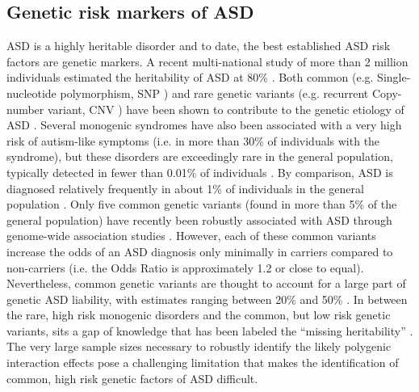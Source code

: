 \documentclass[9pt,lineno]{elife}
\begin{document}
\subsection{Genetic risk markers of ASD}
ASD is a highly heritable disorder and to date, the best established ASD risk factors are genetic markers. A recent multi-national study of more than 2 million individuals estimated the heritability of ASD at 80\% \citep{Bai2019-hb}. Both common (e.g. Single-nucleotide polymorphism, SNP \citep{Grove2019-vz}) and rare genetic variants (e.g. recurrent Copy-number variant, CNV \citep{Sanders2019-wi}) have been shown to contribute to the genetic etiology of ASD \citep{Geschwind2015-ss}. Several monogenic syndromes have also been associated with a very high risk of autism-like symptoms (i.e. in more than 30\% of individuals with the syndrome), but these disorders are exceedingly rare in the general population, typically detected in fewer than 0.01\% of individuals \citep{De_la_Torre-Ubieta2016-fw}. By comparison, ASD is diagnosed relatively frequently in about 1\% of individuals in the general population \citep{Bai2019-hb}. Only five common genetic variants (found in more than 5\% of the general population) have recently been robustly associated with ASD through genome-wide association studies \citep{Grove2019-vz}. However, each of these common variants increase the odds of an ASD diagnosis only minimally in carriers compared to non-carriers (i.e. the Odds Ratio is approximately 1.2 or close to equal). Nevertheless, common genetic variants are thought to account for a large part of genetic ASD liability, with estimates ranging between 20\% \citep{Robinson2016-dd} and 50\% \citep{Gaugler2014-vi}. In between the rare, high risk monogenic disorders and the common, but low risk genetic variants, sits a gap of knowledge that has been labeled the “missing heritability” \citep{Manolio2009-sr,Maher2008-dz}. The very large sample sizes necessary \citep{Khera2018-of} to robustly identify the likely polygenic interaction effects \citep{OConnor2019-wp} pose a challenging limitation that makes the identification of common, high risk genetic factors of ASD difficult.
\end{document}
